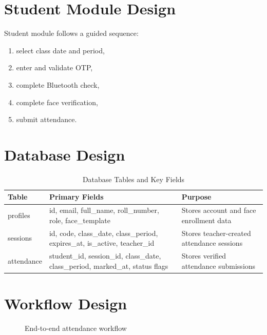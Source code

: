 \section{Student Module Design}
Student module follows a guided sequence:
\begin{enumerate}
\item select class date and period,
\item enter and validate OTP,
\item complete Bluetooth check,
\item complete face verification,
\item submit attendance.
\end{enumerate}

\section{Database Design}
\begin{table}[H]
\centering
\caption{Database Tables and Key Fields}
\label{c4:tab1}
\begin{tabular}{|L{2.2cm}|L{4.2cm}|L{5.6cm}|}
\hline
\textbf{Table} & \textbf{Primary Fields} & \textbf{Purpose}\\
\hline
profiles & id, email, full\_name, roll\_number, role, face\_template & Stores account and face enrollment data\\
\hline
sessions & id, code, class\_date, class\_period, expires\_at, is\_active, teacher\_id & Stores teacher-created attendance sessions\\
\hline
attendance & student\_id, session\_id, class\_date, class\_period, marked\_at, status flags & Stores verified attendance submissions\\
\hline
\end{tabular}
\end{table}

\section{Workflow Design}
\begin{figure}[H]
\centering
{}
\caption{End-to-end attendance workflow}
\label{c4:fig2}
\end{figure}

